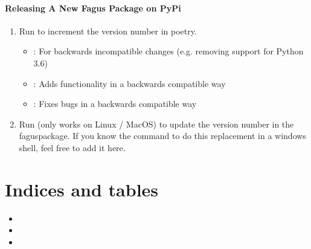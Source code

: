\documentclass[a4paper,10pt,english]{sphinxmanual}
\begin{document}
\subsubsection{Releasing A New Fagus Package on PyPi}
\label{\detokenize{CONTRIBUTING:releasing-a-new-fagus-package-on-pypi}}\begin{enumerate}
%
\item {}
\sphinxAtStartPar
Run to increment the version number in poetry.
\begin{itemize}
\item {}
\sphinxAtStartPar
{}: For backwards incompatible changes (e.g. removing support for Python 3.6)

\item {}
\sphinxAtStartPar
{}: Adds functionality in a backwards compatible way

\item {}
\sphinxAtStartPar
{}: Fixes bugs in a backwards compatible way

\end{itemize}

\item {}
\sphinxAtStartPar
Run  (only works on Linux / MacOS) to update the version number in the fagus\sphinxhyphen{}package. If you know the command to do this replacement in a windows shell, feel free to add it here.

\end{enumerate}


\chapter{Indices and tables}
\label{\detokenize{index:indices-and-tables}}\begin{itemize}
\item {}
\sphinxAtStartPar
{}

\item {}
\sphinxAtStartPar
{}

\item {}
\sphinxAtStartPar
{}

\end{itemize}
\end{document}

